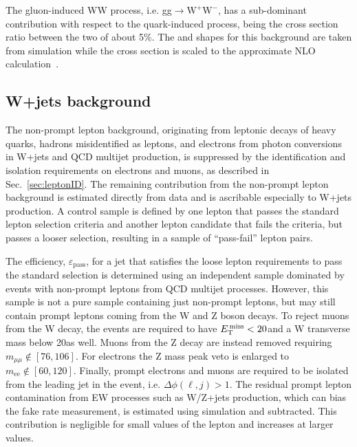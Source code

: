 The gluon-induced WW process, i.e. gg$\to \mathrm{W^{+}W^{-}}$, has a sub-dominant contribution with respect to the quark-induced process, being the cross section ratio between the two of about 5\%. The \mll and \mt shapes for this background are taken from simulation while the cross section is scaled to the approximate NLO calculation~\cite{Bonvini:2013jha,Passarino:2013bha}.




\subsection{W+jets background\label{sec:wjetsbkg}}	

The non-prompt lepton background, originating from leptonic decays of heavy quarks, hadrons
misidentified as leptons, and electrons from photon conversions in W+jets and QCD multijet production, is suppressed by the identification and isolation requirements on electrons and muons,  as described in Sec.~\ref{sec:leptonID}. The remaining contribution from the non-prompt lepton background is estimated directly from data and is ascribable especially to W+jets production. A control sample is defined by one lepton that passes the standard lepton selection criteria and another lepton candidate that fails the criteria, but passes a looser selection, resulting in a sample of ``pass-fail'' lepton pairs. 

The efficiency, $\varepsilon_\mathrm{pass}$, for a jet that satisfies the loose lepton requirements to pass the standard selection is determined using an independent sample dominated by events with non-prompt leptons from QCD multijet processes. However, this sample is not a pure sample containing just non-prompt leptons, but may still contain prompt leptons coming from the W and Z boson decays. To reject muons from the W decay, the events are required to have $E_\mathrm{T}^\mathrm{\,miss}<20$\GeV and a W transverse mass below 20\GeV as well. Muons from the Z decay are instead removed requiring $m_{\mu\mu} \notin [76,106]$\GeV. For electrons the Z mass peak veto is enlarged to $m_\mathrm{ee} \notin [60,120]$\GeV. Finally, prompt electrons and muons are required to be isolated from the leading jet in the event, i.e. $\Delta\phi(\ell,j)>1$. The residual prompt lepton contamination from EW processes such as W/Z+jets production, which can bias the fake rate measurement, is estimated using simulation and subtracted. This contribution is negligible for small values of the lepton \pt and increases at larger \pt values.

